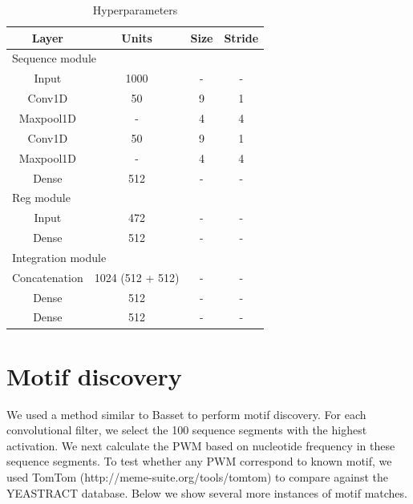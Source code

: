 \documentclass{article}
\begin{document}
\begin{table}
\centering
\begin{tabular}{| c | c | c | c |}
\hline
Layer & Units & Size & Stride \\
\hline
\hline
\multicolumn{4}{|l|}{Sequence module}\\
\hline
Input & 1000 & - & - \\
\hline
Conv1D & 50 & 9 & 1 \\
\hline
Maxpool1D & - & 4 & 4 \\
\hline
Conv1D & 50 & 9 & 1 \\
\hline
Maxpool1D & - & 4 & 4 \\
\hline
Dense & 512 & - & - \\
\hline
\multicolumn{4}{|l|}{Reg module}\\
\hline
Input & 472 & - & - \\
\hline
Dense & 512 & - & - \\
\hline
\multicolumn{4}{|l|}{Integration module}\\
\hline
Concatenation & 1024 (512 + 512) & - & - \\
\hline
Dense & 512 & - & - \\
\hline 
Dense & 512 & - & - \\
\hline
\end{tabular}
\caption{Hyperparameters}
\label{Hyerparameters}
\end{table}


\section{Motif discovery}
We used a method similar to Basset \cite{Kelley:2016bv} to perform motif discovery. For each convolutional filter, we select the 100 sequence segments with the highest activation. We next calculate the PWM based on nucleotide frequency in these sequence segments. To test whether any PWM correspond to known motif, we used TomTom (http://meme-suite.org/tools/tomtom) to compare against the YEASTRACT database. Below we show several more instances of motif matches. 
\end{document}
